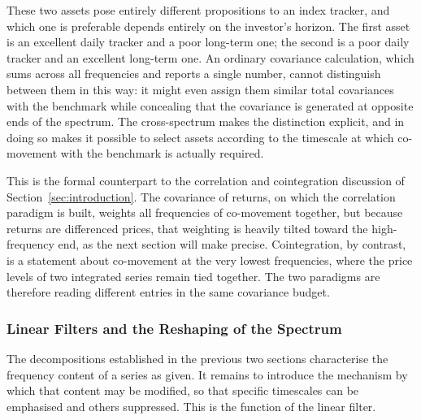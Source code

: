 \documentclass[12pt,a4paper]{article}
\begin{document}
These two assets pose entirely different propositions to an index
tracker, and which one is preferable depends entirely on the investor's
horizon. The first asset is an excellent daily tracker and a poor
long-term one; the second is a poor daily tracker and an excellent
long-term one. An ordinary covariance calculation, which sums across all
frequencies and reports a single number, cannot distinguish between them
in this way: it might even assign them similar total covariances with the
benchmark while concealing that the covariance is generated at opposite
ends of the spectrum. The cross-spectrum makes the distinction explicit,
and in doing so makes it possible to select assets according to the
timescale at which co-movement with the benchmark is actually required.

This is the formal counterpart to the correlation and cointegration
discussion of Section~\ref{sec:introduction}. The covariance of returns,
on which the correlation paradigm is built, weights all frequencies of
co-movement together, but because returns are differenced prices, that
weighting is heavily tilted toward the high-frequency end, as the next
section will make precise. Cointegration, by contrast, is a statement
about co-movement at the very lowest frequencies, where the price levels
of two integrated series remain tied together. The two paradigms are
therefore reading different entries in the same covariance budget.

\subsubsection{Linear Filters and the Reshaping of the Spectrum}
\label{sec:filters}

The decompositions established in the previous two sections characterise
the frequency content of a series as given. It remains to introduce the
mechanism by which that content may be modified, so that specific
timescales can be emphasised and others suppressed. This is the function
of the linear filter.
\end{document}
